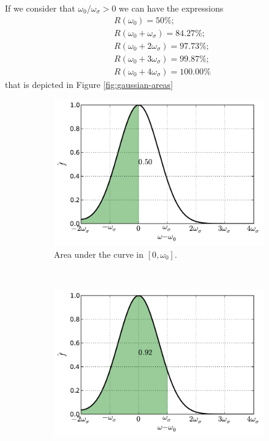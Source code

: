 \documentclass[12pt,letterpaper]{article}
\begin{document}
{If we consider that \(\omega_0/\omega_\sigma >0\) we can have the expressions
\begin{align*}
    &R(\omega_0) = 50\%;\\
    &R(\omega_0 + \omega_\sigma) = 84.27\%;\\
    &R(\omega_0 + 2\omega_\sigma) = 97.73\%;\\
    &R(\omega_0 + 3\omega_\sigma)= 99.87\%;\\
    &R(\omega_0 + 4\omega_\sigma) = 100.00\%
\end{align*}
that is depicted in Figure \ref{fig:gaussian-areas}
\begin{figure}[h]
    \centering
    \begin{subfigure}[b]{0.45\textwidth}
        \includegraphics[width=\textwidth]{img/gaussian_area=1.pdf}
        \caption{Area under the curve in $[0,\omega_0]$.}
    \end{subfigure}\
    \begin{subfigure}[b]{0.45\textwidth}
        \includegraphics[width=\textwidth]{img/gaussian_area=2.pdf}

\end{subfigure}
\end{figure}}
\end{document}
